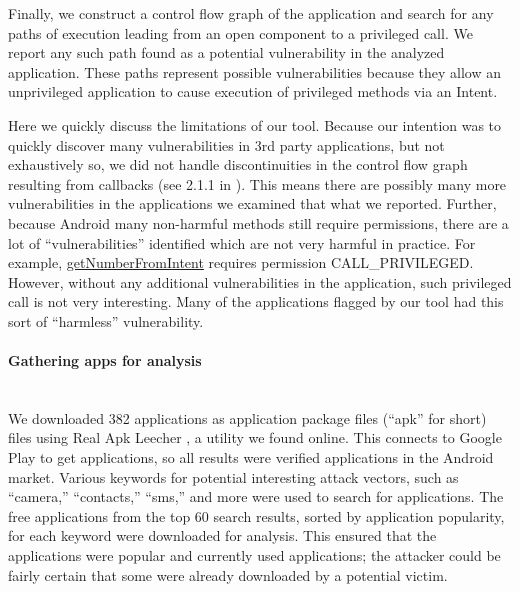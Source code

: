 \documentclass[12pt,a4paper]{article}
\begin{document}
Finally, we construct a control flow graph of the application and search for any
paths of execution leading from an open component to a privileged call. We
report any such path found as a potential vulnerability in the analyzed
application. These paths represent possible vulnerabilities because they allow
an unprivileged application to cause execution of privileged methods via an
Intent.

Here we quickly discuss the limitations of our tool. Because our intention was
to quickly discover many vulnerabilities in 3rd party applications, but not
exhaustively so, we did not handle discontinuities in the control flow graph
resulting from callbacks (see 2.1.1 in \cite{grace_systematic_2012}). This means
there are possibly many more vulnerabilities in the applications we examined
that what we reported. Further, because Android many non-harmful methods still
require permissions, there are a lot of ``vulnerabilities'' identified which are
not very harmful in practice. For example,
\href{https://developer.android.com/reference/android/telephony/PhoneNumberUtils.html#getNumberFromIntent\%28android.content.Intent,\%20android.content.Context\%29}{getNumberFromIntent}
requires permission CALL\_PRIVILEGED. However, without any additional
vulnerabilities in the application, such privileged call is not very
interesting. Many of the applications flagged by our tool had this sort of
``harmless'' vulnerability.

\paragraph{Gathering apps for analysis} ~\\
We downloaded 382 applications as application package files (``apk'' for short)
files using Real Apk Leecher \cite{apkleecher}, a utility we found online. This
connects to Google Play to get applications, so all results were verified
applications in the Android market. Various keywords for potential interesting
attack vectors, such as ``camera,'' ``contacts,'' ``sms,'' and more were used to
search for applications. The free applications from the top 60 search results,
sorted by application popularity, for each keyword were downloaded for analysis.
This ensured that the applications were popular and currently used applications;
the attacker could be fairly certain that some were already downloaded by a
potential victim.
\end{document}
